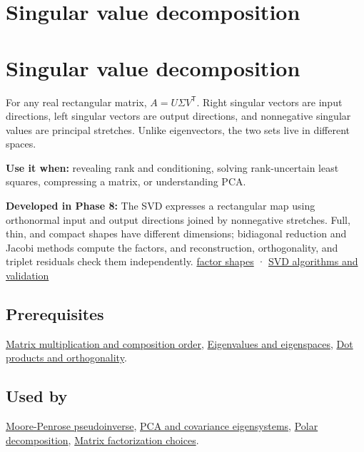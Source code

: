\hypertarget{appendix-1fad5e7f36fa}{}
\section*{Singular value decomposition}
\section{Singular value decomposition}\label{appendix-1fad5e7f36fa-singular-value-decomposition}

For any real rectangular matrix, \(A=U\Sigma V^\mathsf T\). Right singular vectors are input directions, left singular vectors are output directions, and nonnegative singular values are principal stretches. Unlike eigenvectors, the two sets live in different spaces.

\textbf{Use it when:} revealing rank and conditioning, solving rank-uncertain least squares, compressing a matrix, or understanding PCA.

\textbf{Developed in Phase 8:} The SVD expresses a rectangular map using orthonormal input and output directions joined by nonnegative stretches. Full, thin, and compact shapes have different dimensions; bidiagonal reduction and Jacobi methods compute the factors, and reconstruction, orthogonality, and triplet residuals check them independently. \hyperref[02-foundations-ii-ch024-full-thin-and-compact-shapes-for-tall-and-wide-matrices]{factor shapes} · \hyperref[02-foundations-ii-ch024-how-numerical-software-computes-and-checks-an-svd]{SVD algorithms and validation}

\subsection{Prerequisites}\label{appendix-1fad5e7f36fa-prerequisites}

\hyperref[appendix-ab31ef447dbf]{Matrix multiplication and composition order}, \hyperref[appendix-0b3be18411f9]{Eigenvalues and eigenspaces}, \hyperref[appendix-8bc4e8fc547c]{Dot products and orthogonality}.

\subsection{Used by}\label{appendix-1fad5e7f36fa-used-by}

\hyperref[appendix-541306fdbc1b]{Moore-Penrose pseudoinverse}, \hyperref[appendix-ad175ef3c5bf]{PCA and covariance eigensystems}, \hyperref[appendix-73f5bcf7a462]{Polar decomposition}, \hyperref[appendix-221a483bec2d]{Matrix factorization choices}.

